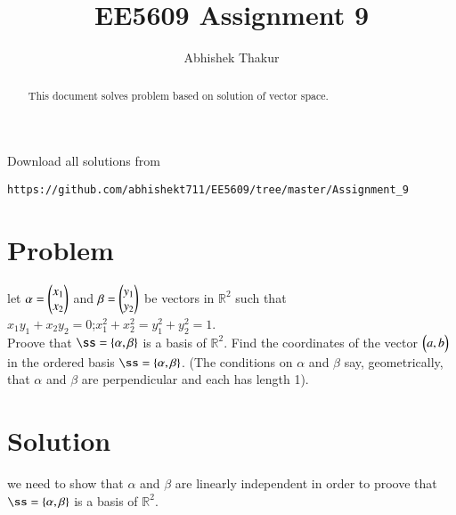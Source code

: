 \documentclass[journal,12pt,twocolumn]{IEEEtran}
\begin{document}
     \def\rightbox#1{\makebox[0in][r]{#1}}
     \def\centbox#1{\makebox[0in]{#1}}
     \def\topbox#1{\raisebox{-\baselineskip}[0in][0in]{#1}}
     \def\midbox#1{\raisebox{-0.5\baselineskip}[0in][0in]{#1}}
\vspace{3cm}
\title{EE5609 Assignment 9}
\author{Abhishek Thakur}
\maketitle
\newpage
\bigskip
\renewcommand{\thefigure}{\theenumi}
\renewcommand{\thetable}{\theenumi}
\begin{abstract}
This document solves problem based on solution of vector space.
\end{abstract}
Download all solutions from 
\begin{lstlisting}
https://github.com/abhishekt711/EE5609/tree/master/Assignment_9
\end{lstlisting}
\section{Problem}
let $\alpha=\begin{pmatrix}x_1\\x_2\end{pmatrix}$ and $\beta=\begin{pmatrix}y_1\\y_2\end{pmatrix}$ be vectors in $\mathbb{R}^2$ such that\\
$x_1y_1+x_2y_2=0$;\quad $x_1^2+x_2^2=y_1^2+y_2^2=1$.\\
Proove that $\ss=\{\vec{\alpha},\vec{\beta}\}$ is a basis of $\mathbb{R}^2$. Find the coordinates of the vector $\begin{pmatrix}a,b\end{pmatrix}$ in the ordered basis $\ss=\{\vec{\alpha},\vec{\beta}\}$. (The conditions on $\alpha$ and $\beta$ say, geometrically, that $\alpha$ and $\beta$ are perpendicular and each has length 1).
\section{Solution}
we need to show that $\alpha$ and $\beta$ are linearly independent in order to proove that $\ss=\{\vec{\alpha},\vec{\beta}\}$ is a basis of $\mathbb{R}^2$.\\
\end{document}
